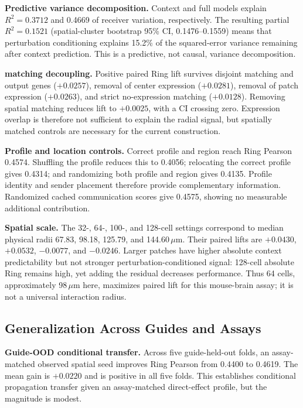 \textbf{Predictive variance decomposition.}
Context and full models explain $R^2=0.3712$ and 0.4669 of receiver variation,
respectively. The resulting partial $R^2=0.1521$ (spatial-cluster bootstrap
95\% CI, 0.1476--0.1559) means that perturbation conditioning explains 15.2\%
of the squared-error variance remaining after context prediction. This is a
predictive, not causal, variance decomposition.

\textbf{\ppp matching decoupling.}
Positive paired Ring lift survives disjoint matching and output genes
($+0.0257$), removal of center expression ($+0.0281$), removal of
patch expression ($+0.0263$), and strict no-expression matching
($+0.0128$). Removing spatial matching reduces lift to $+0.0025$, with a CI
crossing zero. Expression overlap is therefore not sufficient to explain the
radial signal, but spatially matched controls are necessary for the current
\ppp construction.

\textbf{Profile and location controls.}
Correct profile and region reach Ring Pearson 0.4574. Shuffling the profile
reduces this to 0.4056; relocating the correct profile gives 0.4314; and
randomizing both profile and region gives 0.4135. Profile identity and sender
placement therefore provide complementary information. Randomized cached
communication scores give 0.4575, showing no measurable additional
contribution.

\textbf{Spatial scale.}
The 32-, 64-, 100-, and 128-cell settings correspond to median physical radii
67.83, 98.18, 125.79, and 144.60\,$\mu$m. Their paired lifts are $+0.0430$,
$+0.0532$, $-0.0077$, and $-0.0246$. Larger patches have higher absolute
context predictability but not stronger perturbation-conditioned signal:
128-cell absolute Ring remains high, yet adding the residual decreases
performance. Thus 64 cells, approximately 98\,$\mu$m here, maximizes paired
lift for this mouse-brain assay; it is not a universal interaction radius.

\subsection{Generalization Across Guides and Assays}
\label{sec:generalization}
\textbf{Guide-OOD conditional transfer.}
Across five guide-held-out folds, an assay-matched observed spatial seed
improves Ring Pearson from 0.4400 to 0.4619. The mean gain is $+0.0220$ and is
positive in all five folds. This establishes conditional propagation transfer
given an assay-matched direct-effect profile, but the magnitude is modest.

